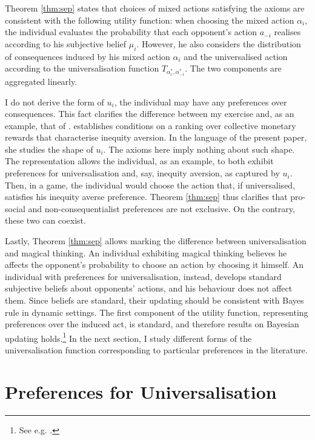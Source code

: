 Theorem \ref{thm:sep} states that choices of mixed actions satisfying the axioms are consistent with the following utility function: when choosing the mixed action \( \alpha_i \), the individual evaluates the probability that each opponent's action \( a_{-i} \) realises according to his subjective belief \( \mu_i \). However, he also considers the distribution of consequences induced by his mixed action \( \alpha_i \) and the universalised action according to the universalisation function \( T_{\alpha^{*}_i, \alpha^{*}_{-i}} \). The two components are aggregated linearly.

I do not derive the form of \( u_i \), the individual may have any preferences over consequences. This fact clarifies the difference between my exercise and, as an example, that of \cite{rohdePreferenceFoundationFehr2010}. \cite{rohdePreferenceFoundationFehr2010} establishes conditions on a ranking over collective monetary rewards that characterise inequity aversion. In the language of the present paper, she studies the shape of \( u_i \). The axioms here imply nothing about such shape. The representation allows the individual, as an example, to both exhibit preferences for universalisation and, say, inequity aversion, as captured by \( u_i \). Then, in a game, the individual would choose the action that, if universalised, satisfies his inequity averse preference. Theorem \ref{thm:sep} thus clarifies that pro-social and non-consequentialist preferences are not exclusive. On the contrary, these two can coexist.

Lastly, Theorem \ref{thm:sep} allows marking the difference between universalisation and magical thinking. An individual exhibiting magical thinking believes he affects the opponent's probability to choose an action by choosing it himself. An individual with preferences for universalisation, instead, develops standard subjective beliefs about opponents' actions, and his behaviour does not affect them. Since beliefs are standard, their updating should be consistent with Bayes rule in dynamic settings. The first component of the utility function, representing preferences over the induced act, is standard, and therefore results on Bayesian updating holds.\footnote{See e.g. \cite{epsteinRecursiveMultiplepriors2003,ghirardatoRevisitingSavageConditional2002}.} In the next section, I study different forms of the universalisation function corresponding to particular preferences in the literature.

\section{Preferences for Universalisation}\label{sec:applicationsuniv}

